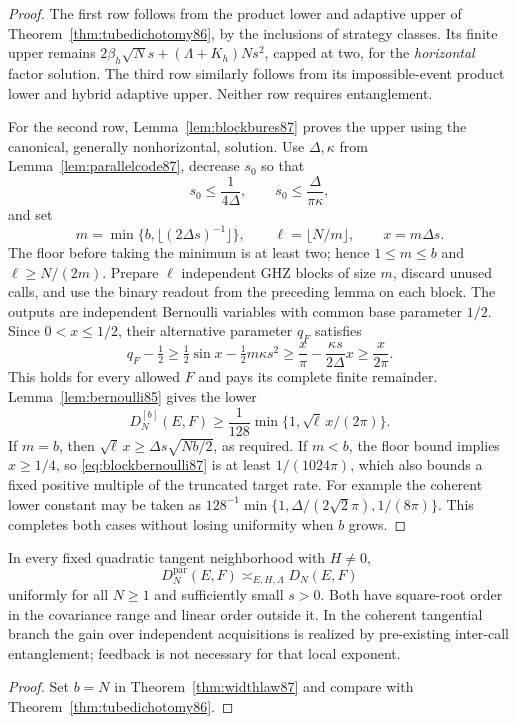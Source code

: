\begin{proof}
The first row follows from the product lower and adaptive upper of
Theorem~\ref{thm:tubedichotomy86}, by the inclusions of strategy
classes.  Its finite upper remains
$2\beta_h\sqrt N s+(\Lambda+K_h)Ns^2$, capped at two, for the
\emph{horizontal} factor solution.  The third row similarly follows
from its impossible-event product lower and hybrid adaptive upper.
Neither row requires entanglement.

For the second row, Lemma~\ref{lem:blockbures87} proves the upper
using the canonical, generally nonhorizontal, solution.  Use
$\Delta,\kappa$ from Lemma~\ref{lem:parallelcode87}, decrease $s_0$
so that
\[
 s_0\le\frac1{4\Delta},\qquad
 s_0\le\frac{\Delta}{\pi\kappa},
\]
and set
\begin{equation}\label{eq:blockchoice87}
 m=\min\{b,\lfloor(2\Delta s)^{-1}\rfloor\},\qquad
 \ell=\lfloor N/m\rfloor,\qquad x=m\Delta s.
\end{equation}
The floor before taking the minimum is at least two; hence
$1\le m\le b$ and $\ell\ge N/(2m)$.  Prepare $\ell$ independent
GHZ blocks of size $m$, discard unused calls, and use the binary
readout from the preceding lemma on each block.  The outputs are
independent Bernoulli variables with common base parameter $1/2$.
Since $0<x\le1/2$, their alternative parameter $q_F$ satisfies
\[
 q_F-\tfrac12
 \ge\tfrac12\sin x-\tfrac12m\kappa s^2
 \ge\frac{x}{\pi}-\frac{\kappa s}{2\Delta}x
 \ge\frac{x}{2\pi}.
\]
This holds for every allowed $F$ and pays its complete finite
remainder.  Lemma~\ref{lem:bernoulli85} gives the lower
\begin{equation}\label{eq:blockbernoulli87}
 D_N^{[b]}(E,F)\ge\frac1{128}
             \min\{1,\sqrt\ell\,x/(2\pi)\}.
\end{equation}
If $m=b$, then
$\sqrt\ell\,x\ge\Delta s\sqrt{Nb/2}$, as required.
If $m<b$, the floor bound implies $x\ge1/4$, so
\eqref{eq:blockbernoulli87} is at least $1/(1024\pi)$, which
also bounds a fixed positive multiple of the truncated target rate.
For example the coherent lower constant may be taken as
$128^{-1}\min\{1,\Delta/(2\sqrt2\pi),1/(8\pi)\}$.
This completes both cases without losing uniformity when $b$ grows.
\end{proof}

\begin{corollary}\label{cor:parallel87}
In every fixed quadratic tangent neighborhood with $H\ne0$,
\[
 D_N^{\mathrm{par}}(E,F)\asymp_{E,H,\Lambda}D_N(E,F)
\]
uniformly for all $N\ge1$ and sufficiently small $s>0$.
Both have square-root order in the covariance range and linear
order outside it.  In the coherent tangential branch the gain over
independent acquisitions is realized by pre-existing inter-call
entanglement; feedback is not necessary for that local exponent.
\end{corollary}
\begin{proof}
Set $b=N$ in Theorem~\ref{thm:widthlaw87} and compare with
Theorem~\ref{thm:tubedichotomy86}.
\end{proof}

